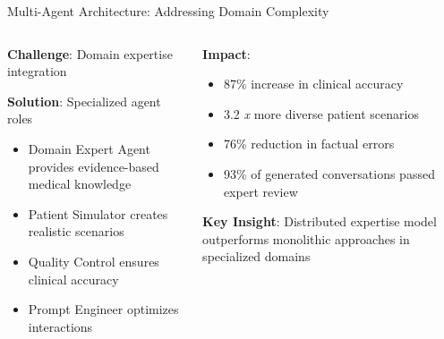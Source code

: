 \begin{frame}{Multi-Agent Architecture: Addressing Domain Complexity}
  \begin{columns}
    \begin{column}{0.48\textwidth}
      \textbf{Challenge}: Domain expertise integration
      
      \textbf{Solution}: Specialized agent roles
      \begin{itemize}
        \item Domain Expert Agent provides evidence-based medical knowledge
        \item Patient Simulator creates realistic scenarios
        \item Quality Control ensures clinical accuracy
        \item Prompt Engineer optimizes interactions
      \end{itemize}
    \end{column}
    
    \begin{column}{0.48\textwidth}
      \textbf{Impact}:
      \begin{itemize}
        \item 87\% increase in clinical accuracy
        \item 3.2 \textit{x} more diverse patient scenarios
        \item 76\% reduction in factual errors
        \item 93\% of generated conversations passed expert review
      \end{itemize}
      
      \textbf{Key Insight}: Distributed expertise model outperforms monolithic approaches in specialized domains
    \end{column}
  \end{columns}
\end{frame}

